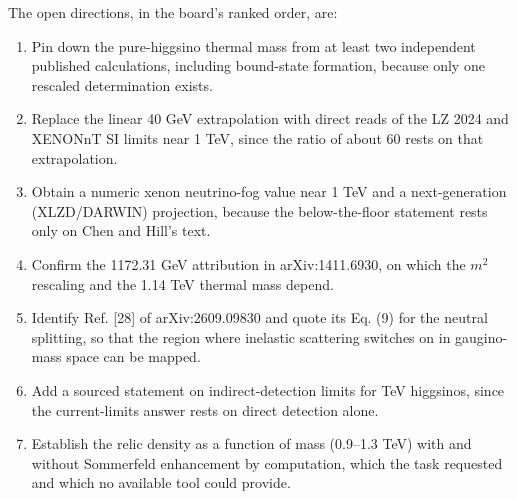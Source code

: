 \documentclass[11pt,a4paper]{article}
\begin{document}
The open directions, in the board's ranked order, are:
\begin{enumerate}
\item Pin down the pure-higgsino thermal mass from at least two independent published calculations, including bound-state formation, because only one rescaled determination exists.
\item Replace the linear 40 GeV extrapolation with direct reads of the LZ 2024 and XENONnT SI limits near 1 TeV, since the ratio of about 60 rests on that extrapolation.
\item Obtain a numeric xenon neutrino-fog value near 1 TeV and a next-generation (XLZD/DARWIN) projection, because the below-the-floor statement rests only on Chen and Hill's text.
\item Confirm the 1172.31 GeV attribution in arXiv:1411.6930, on which the $m^2$ rescaling and the 1.14 TeV thermal mass depend.
\item Identify Ref. [28] of arXiv:2609.09830 and quote its Eq. (9) for the neutral splitting, so that the region where inelastic scattering switches on in gaugino-mass space can be mapped.
\item Add a sourced statement on indirect-detection limits for TeV higgsinos, since the current-limits answer rests on direct detection alone.
\item Establish the relic density as a function of mass (0.9--1.3 TeV) with and without Sommerfeld enhancement by computation, which the task requested and which no available tool could provide.
\end{enumerate}
\end{document}
